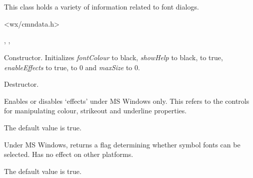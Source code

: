 \section{}\label{wxfontdata}


This class holds a variety of information related to font dialogs.




<wx/cmndata.h>


, , 


\label{wxfontdatactor}


Constructor. Initializes {\it fontColour} to black, {\it showHelp} to black,
 to true, {\it enableEffects} to true,
 to 0 and {\it maxSize} to 0.

\label{wxfontdatadtor}


Destructor.

\label{wxfontdataenableeffects}


Enables or disables `effects' under MS Windows only. This refers to the
controls for manipulating colour, strikeout and underline properties.

The default value is true.

\label{wxfontdatagetallowsymbols}


Under MS Windows, returns a flag determining whether symbol fonts can be selected. Has no
effect on other platforms.

The default value is true.

\label{wxfontdatagetcolour}

